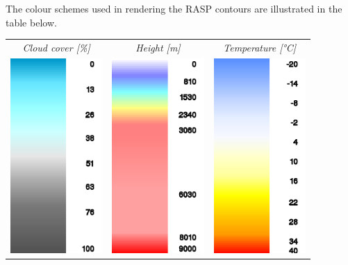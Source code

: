 \begin{maxipage}
The colour schemes used in rendering the RASP contours are illustrated
in the table below.

\begin{longtable}{c c c}
\emph{Cloud cover [\%]} & \emph{Height [m]} & \emph{Temperature [°C]} \\
\includegraphics[angle=0,width=3.5cm,keepaspectratio='true']{figures/ramp-rasp-cloudpct.png} &
\includegraphics[angle=0,width=3.5cm,keepaspectratio='true']{figures/ramp-rasp-h.png} &
\includegraphics[angle=0,width=3.5cm,keepaspectratio='true']{figures/ramp-rasp-temperature.png} \\

\end{longtable}
\end{maxipage}
